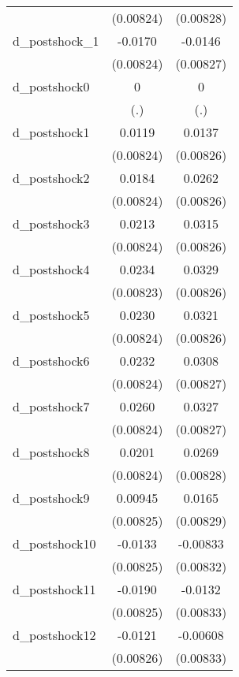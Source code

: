 {\begin{tabular}{l*{2}{c}}
          &(0.00824)         &(0.00828)         \\
d\_postshock\_1&  -0.0170\sym{*}  &  -0.0146         \\
          &(0.00824)         &(0.00827)         \\
d\_postshock0&        0         &        0         \\
          &      (.)         &      (.)         \\
d\_postshock1&   0.0119         &   0.0137         \\
          &(0.00824)         &(0.00826)         \\
d\_postshock2&   0.0184\sym{*}  &   0.0262\sym{**} \\
          &(0.00824)         &(0.00826)         \\
d\_postshock3&   0.0213\sym{**} &   0.0315\sym{***}\\
          &(0.00824)         &(0.00826)         \\
d\_postshock4&   0.0234\sym{**} &   0.0329\sym{***}\\
          &(0.00823)         &(0.00826)         \\
d\_postshock5&   0.0230\sym{**} &   0.0321\sym{***}\\
          &(0.00824)         &(0.00826)         \\
d\_postshock6&   0.0232\sym{**} &   0.0308\sym{***}\\
          &(0.00824)         &(0.00827)         \\
d\_postshock7&   0.0260\sym{**} &   0.0327\sym{***}\\
          &(0.00824)         &(0.00827)         \\
d\_postshock8&   0.0201\sym{*}  &   0.0269\sym{**} \\
          &(0.00824)         &(0.00828)         \\
d\_postshock9&  0.00945         &   0.0165\sym{*}  \\
          &(0.00825)         &(0.00829)         \\
d\_postshock10&  -0.0133         & -0.00833         \\
          &(0.00825)         &(0.00832)         \\
d\_postshock11&  -0.0190\sym{*}  &  -0.0132         \\
          &(0.00825)         &(0.00833)         \\
d\_postshock12&  -0.0121         & -0.00608         \\
          &(0.00826)         &(0.00833)         \\

\end{tabular}}
